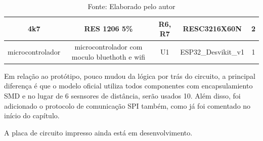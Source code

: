 \documentclass[../poliXuniversity_hospital_-USP-report.tex]{subfiles}
\begin{document}
\begin{table}[]
\begin{adjustbox}{width=\columnwidth,center}
\begin{tabular}{|c|c|c|c|c|}
4k7                  & RES 1206 5\%                                                   & R6, R7                                                                                                                   & RESC3216X60N           & 2        \\ \hline
microcontrolador     & microcontrolador com   moculo bluethoth e wifi                 & U1                                                                                                                       & ESP32\_Desvikit\_v1    & 1        \\ \hline

\end{tabular}
\end{adjustbox}
\centering
\caption*{Fonte: Elaborado pelo autor}
\label{table:voc}
\end{table}

Em relação ao protótipo, pouco mudou da lógica por trás do circuito, a principal diferença é que o modelo oficial utiliza todos componentes com encapsulamiento SMD \cite{SMD_def} e no lugar de 6 sesnsores de distância, serão usados 10. Além disso, foi adicionado o protocolo de comunicação SPI também, como já foi comentado no início do capítulo.


A placa de circuito impresso ainda está em desenvolvimento.

\end{document}
